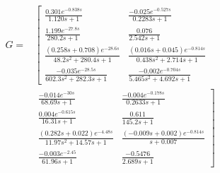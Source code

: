 \begin{equation}
    \begin{array}{ll}
    G=&\left[
        \begin{array}{cc}
            \frac{0.301e^{-0.838s}}{1.120s+1} &
            \frac{-0.025e^{-0.527s}}{0.2283s + 1} \\
            \frac{1.199e^{-27.8s}}{280.2s+1} &
            \frac{0.076}{2.542s+1} \\
            \frac{(0.258s+0.708)e^{-28.6s}}{48.2s^2+280.4s+1} &
            \frac{(0.016s+0.045)e^{-0.814s}}{0.438s^2+2.714s+1} \\
            \frac{-0.035e^{-28.5s}}{602.3s^2+282.3s+1} &
            \frac{-0.002e^{-0.704s}}{5.465s^2+4.692s+1}
        \end{array}
       \right.  \\
    &
     \left.
        \begin{array}{cc}
            \frac{-0.014e^{-30s}}{68.69s+1} &
            \frac{-0.004e^{-0.178s}}{0.2633s+1} \\
            \frac{0.004e^{-0.615s}}{16.31s+1} &
            \frac{0.611}{145.2s+1} \\
            \frac{(0.282s+0.022)e^{-4.48s}}{11.97s^2+14.57s+1} &
            \frac{(-0.009s+0.002)e^{-0.814s}}{s+0.007} \\
            \frac{-0.003e^{-2.45}}{61.96s+1} &
            \frac{-0.5476}{2.689s+1}
        \end{array}
        \right]
     \end{array}\label{eq:BarkBoiler_model}
\end{equation}